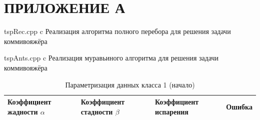 \documentclass{bmstu}[a4paper]
\begin{document}
\chapter*{ПРИЛОЖЕНИЕ А}

{tspRec.cpp}
{c}
{Реализация алгоритма полного перебора для решения задачи коммивояжёра}

{tspAnts.cpp}
{c}
{Реализация муравьиного алгоритма для решения задачи коммивояжёра}


\begin{longtable}{|p{}|p{}|p{}|p{}|}
	\caption{Параметризация данных класса 1 (начало)}\label{tbl:b_log}  \\\hline
	Коэффициент жадности $\alpha$ & Коэффициент стадности $\beta$ & Коэффициент испарения & Ошибка   \\\hline
	\endfirsthead
	

\end{longtable}
\end{document}
